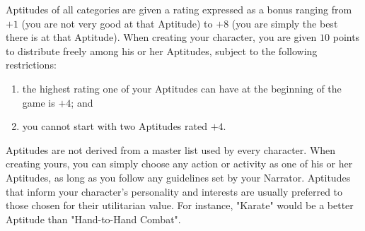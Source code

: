 Aptitudes of all categories are given a rating expressed as a bonus ranging from $+1$ (you are not very good
at that Aptitude) to $+8$ (you are simply the best there is at that Aptitude). When creating your character, you
are given $10$ points to distribute freely among his or her Aptitudes, subject to the following restrictions:
\begin{enumerate}
\item the highest rating one of your Aptitudes can have at the beginning of the game is $+4$; and
\item you cannot start with two Aptitudes rated $+4$.
\end{enumerate}

Aptitudes are not derived from a master list used by every character. When creating yours, you can simply
choose any action or activity as one of his or her Aptitudes, as long as you follow any guidelines set by
your Narrator. Aptitudes that inform your character's personality and interests are usually preferred to
those chosen for their utilitarian value. For instance, "Karate" would be a better Aptitude than "Hand-to-Hand
Combat".
